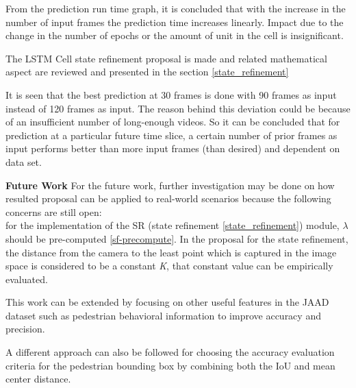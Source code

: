 From the prediction run time graph, it is concluded that with the increase in the number of input frames the prediction time increases linearly. Impact due to the change in the number of epochs or the amount of unit in the cell is insignificant.

The LSTM Cell state refinement proposal is made and related mathematical aspect are reviewed and presented in the section \ref{state_refinement}

It is seen that the best prediction at 30 frames is done with 90 frames as input instead of 120 frames as input. The reason behind this deviation could be because of an insufficient number of long-enough videos. So it can be concluded that for prediction at a particular future time slice, a certain number of prior frames as input performs better than more input frames (than desired) and dependent on data set.

\newpara

\textbf{Future Work}
For the future work, further investigation may be done on how resulted proposal can be applied to real-world scenarios because the following concerns are still open: \\
for the implementation of the SR (state refinement \ref{state_refinement}) module, $\lambda$ should be pre-computed \ref{sf-precompute}. In the proposal for the state refinement, the distance from the camera to the least point which is captured in the image space is considered to be a constant \textit{K}, that constant value can be empirically evaluated.

This work can be extended by focusing on other useful features in the JAAD dataset such as pedestrian behavioral information to improve accuracy and precision.

A different approach can also be followed for choosing the accuracy evaluation criteria for the pedestrian bounding box by combining both the IoU and mean center distance.
